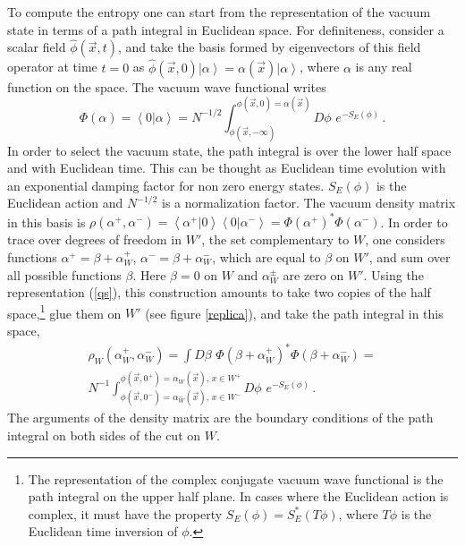 \documentclass[11pt]{article}
\numberwithin{equation}{section}
\begin{document}
To compute the entropy one can start from the representation of the vacuum state in terms of a path integral in Euclidean space.  For definiteness, consider a scalar field $\hat{\phi}(\vec{x},t)$, and take the basis formed by eigenvectors of this field operator at time $t=0$ as $\hat{\phi} (\vec{x},0) \left|  \alpha\right>= \alpha(\vec{x})\left|  \alpha\right>$, where $\alpha$ is any real function on the space. The vacuum wave functional writes   
\begin{equation}
\Phi(\alpha)=\left<0|\alpha\right>=N^{-1/2}\int_{\phi(\vec{x},-\infty)}^{\phi(\vec{x},0)=\alpha(\vec{x})} D\phi\,\, e^{-S_E(\phi)}\,. \label{qs}
\end{equation} 
In order to select the vacuum state, the path integral is over the lower half space and with Euclidean time. This can be thought as Euclidean time evolution with an exponential damping factor for non zero energy states.  $S_E(\phi)$ is the Euclidean action and $N^{-1/2}$ is a normalization factor. The vacuum density matrix in this basis is
$\rho(\alpha^+,\alpha^-)=\left<\alpha^+ | 0\right> \left< 0| \alpha^-\right>=\Phi(\alpha^+)^*\Phi(\alpha^-)$. In order to trace over degrees of freedom in $W'$, the set complementary to $W$, one considers functions $\alpha^+=\beta + \alpha_{W}^+$, $\alpha^-=\beta+ \alpha^-_{W}$, which are equal to $\beta$ on $W'$, and sum over all possible functions $\beta$. Here $\beta=0$ on $W$ and $\alpha^\pm_W$ are zero on $W'$.  Using the representation (\ref{qs}), this construction amounts to take two copies of the half space,\footnote{The representation of the complex conjugate vacuum wave functional is the path integral on the upper half plane. In cases where the Euclidean action is complex, it must have the property $S_E(\phi)=S_E^*(T\phi)$, where $T\phi$ is the Euclidean time inversion of $\phi$.} glue them on $W'$ (see figure \ref{replica}), and take the path integral in this space,
\begin{multline}
\rho_W(\alpha_{W}^+,\alpha^-_{W})=\int D\beta\,\, \Phi(\beta + \alpha_{W}^+)^* \Phi(\beta+ \alpha^-_{W})= \\
N^{-1}\int_{\phi(\vec{x},0^-)=\alpha^-_W(\vec{x}),\, x\in W^- }^{\phi(\vec{x},0^+)=\alpha_W(\vec{x}),\,x\in W^+} D\phi\,\, e^{-S_E(\phi)}\,. \label{opre}
\end{multline}
The arguments of the density matrix are the boundary conditions of the path integral on both sides of the cut on $W$. 
\end{document}
